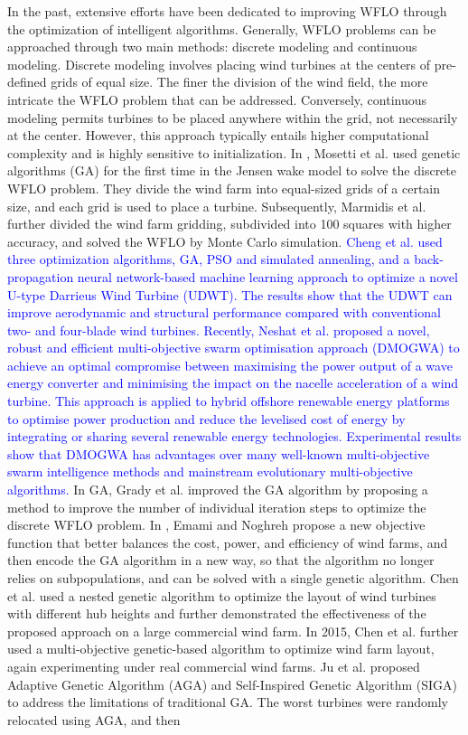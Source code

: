 \documentclass[review]{elsarticle}
\begin{document}
In the past, extensive efforts have been dedicated to improving WFLO through the optimization of intelligent algorithms. Generally, WFLO problems can be approached through two main methods: discrete modeling and continuous modeling. Discrete modeling involves placing wind turbines at the centers of pre-defined grids of equal size. The finer the division of the wind field, the more intricate the WFLO problem that can be addressed. Conversely, continuous modeling permits turbines to be placed anywhere within the grid, not necessarily at the center. However, this approach typically entails higher computational complexity and is highly sensitive to initialization. In \cite{mosetti1994optimization}, Mosetti et al. used genetic algorithms (GA) for the first time in the Jensen wake model to solve the discrete WFLO problem. They divide the wind farm into equal-sized grids of a certain size, and each grid is used to place a turbine. Subsequently, Marmidis et al. \cite{marmidis2008optimal} further divided the wind farm gridding, subdivided into 100 squares with higher accuracy, and solved the WFLO by Monte Carlo simulation. \textcolor{blue}{Cheng et al. \cite{cheng2022design} used three optimization algorithms, GA, PSO and simulated annealing, and a back-propagation neural network-based machine learning approach to optimize a novel U-type Darrieus Wind Turbine (UDWT). The results show that the UDWT can improve aerodynamic and structural performance compared with conventional two- and four-blade wind turbines. Recently, Neshat et al. \cite{neshat2024enhancing} proposed a novel, robust and efficient multi-objective swarm optimisation approach (DMOGWA) to achieve an optimal compromise between maximising the power output of a wave energy converter and minimising the impact on the nacelle acceleration of a wind turbine. This approach is applied to hybrid offshore renewable energy platforms to optimise power production and reduce the levelised cost of energy by integrating or sharing several renewable energy technologies. Experimental results show that DMOGWA has advantages over many well-known multi-objective swarm intelligence methods and mainstream evolutionary multi-objective algorithms.} In GA, Grady et al. \cite{grady2005placement} improved the GA algorithm by proposing a method to improve the number of individual iteration steps to optimize the discrete WFLO problem. In \cite{emami2010new}, Emami and Noghreh propose a new objective function that better balances the cost, power, and efficiency of wind farms, and then encode the GA algorithm in a new way, so that the algorithm no longer relies on subpopulations, and can be solved with a single genetic algorithm. Chen et al. \cite{chen2013wind} used a nested genetic algorithm to optimize the layout of wind turbines with different hub heights and further demonstrated the effectiveness of the proposed approach on a large commercial wind farm. In 2015, Chen et al. \cite{chen2013wind} further used a multi-objective genetic-based algorithm to optimize wind farm layout, again experimenting under real commercial wind farms. Ju et al. \cite{ju2019wind} proposed Adaptive Genetic Algorithm (AGA) and Self-Inspired Genetic Algorithm (SIGA) to address the limitations of traditional GA. The worst turbines were randomly relocated using AGA, and then 
\end{document}
